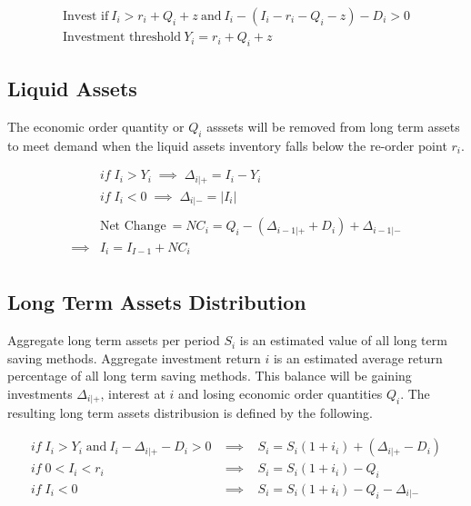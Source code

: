 \documentclass{article}
\begin{document}
\begin{equation}
	\begin{split}
		\text{Invest if} \: I_{i} > r_{i} + Q_{i} + z \:\text{and} \: I_{i} - ( I_{i} - r_{i} - Q_{i} - z) - D_{i} > 0 \\
		\text{Investment threshold} \: Y_{i} =  r_{i} + Q_{i} + z 
	\end{split}
\end{equation}

\subsection{Liquid Assets}
The economic order quantity or $Q_{i}$  asssets will be removed from long term assets to meet demand when the liquid assets inventory falls below the re-order point $r_{i}$.

\begin{align*}
	& if \; I_{i} > Y_{i} \;\implies\;	 \Delta_{i|+} = I_{i} - Y_{i}\\
	& if \; I_{i} < 0 \;\implies\; 	 \Delta_{i|-} = |I_{i}|\\ 
	\\
	& \text{Net Change} \: = NC_{i}= Q_{i} -( \Delta_{i-1|+} + D_{i})+\Delta_{i-1|-}\\
										\implies & I_{i} = I_{I-1} + NC_{i}\\
\end{align*}

\subsection{Long Term Assets Distribution}
Aggregate long term assets per period $S_{i}$ is an estimated value of all long term saving methods. Aggregate investment return $i$ is an estimated average return percentage of all long term saving methods.  This balance will be gaining investments $\Delta_{i|+}$, interest at $i$ and losing economic order quantities $Q_{i}$. The resulting long term assets distribusion is defined by the following. 

\begin{align*}
	if \; I_{i} > Y_{i} \; \text{and} \: I_{i} - \Delta_{i|+} - D_{i} > 0 	& \implies \;\;\; S_{i} = S_{i}(1+i_{i}) + ( \Delta_{i|+} - D_{i})\\
	if \; 0 < I_{i} < r_{i} 							& \implies \;\;\; S_{i} = S_{i}(1+i_{i}) - Q_{i}\\
	if \; I_{i} < 0  								& \implies \;\;\; S_{i} = S_{i}(1+i_{i}) - Q_{i} -  \Delta_{i|-}\\
\end{align*}
\end{document}
